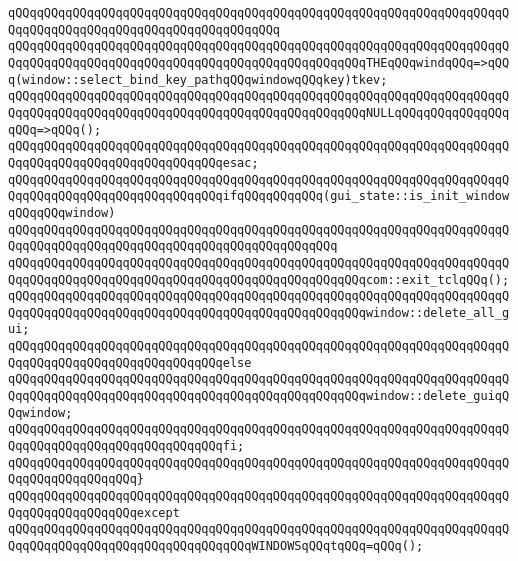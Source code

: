 \verb|qQQqqQQqqQQqqQQqqQQqqQQqqQQqqQQqqQQqqQQqqQQqqQQqqQQqqQQqqQQqqQQqqQQqqQQqqQQqqQQqqQQqqQQqqQQqqQQqqQQqqQQqqQQq|\newline
\verb|qQQqqQQqqQQqqQQqqQQqqQQqqQQqqQQqqQQqqQQqqQQqqQQqqQQqqQQqqQQqqQQqqQQqqQQqqQQqqQQqqQQqqQQqqQQqqQQqqQQqqQQqqQQqqQQqqQQqqQQqTHEqQQqwindqQQq=>qQQq(window::select_bind_key_pathqQQqwindowqQQqkey)tkev;|\newline
\verb|qQQqqQQqqQQqqQQqqQQqqQQqqQQqqQQqqQQqqQQqqQQqqQQqqQQqqQQqqQQqqQQqqQQqqQQqqQQqqQQqqQQqqQQqqQQqqQQqqQQqqQQqqQQqqQQqqQQqqQQqNULLqQQqqQQqqQQqqQQqqQQq=>qQQq();|\newline
\verb|qQQqqQQqqQQqqQQqqQQqqQQqqQQqqQQqqQQqqQQqqQQqqQQqqQQqqQQqqQQqqQQqqQQqqQQqqQQqqQQqqQQqqQQqqQQqqQQqqQQqesac;|\newline
\newline
\verb|qQQqqQQqqQQqqQQqqQQqqQQqqQQqqQQqqQQqqQQqqQQqqQQqqQQqqQQqqQQqqQQqqQQqqQQqqQQqqQQqqQQqqQQqqQQqqQQqqQQqifqQQqqQQqqQQq(gui_state::is_init_windowqQQqqQQqwindow)|\newline
\verb|qQQqqQQqqQQqqQQqqQQqqQQqqQQqqQQqqQQqqQQqqQQqqQQqqQQqqQQqqQQqqQQqqQQqqQQqqQQqqQQqqQQqqQQqqQQqqQQqqQQqqQQqqQQqqQQqqQQq|\newline
\verb|qQQqqQQqqQQqqQQqqQQqqQQqqQQqqQQqqQQqqQQqqQQqqQQqqQQqqQQqqQQqqQQqqQQqqQQqqQQqqQQqqQQqqQQqqQQqqQQqqQQqqQQqqQQqqQQqqQQqqQQqcom::exit_tclqQQq();|\newline
\verb|qQQqqQQqqQQqqQQqqQQqqQQqqQQqqQQqqQQqqQQqqQQqqQQqqQQqqQQqqQQqqQQqqQQqqQQqqQQqqQQqqQQqqQQqqQQqqQQqqQQqqQQqqQQqqQQqqQQqqQQqwindow::delete_all_gui;|\newline
\verb|qQQqqQQqqQQqqQQqqQQqqQQqqQQqqQQqqQQqqQQqqQQqqQQqqQQqqQQqqQQqqQQqqQQqqQQqqQQqqQQqqQQqqQQqqQQqqQQqqQQqelse|\newline
\verb|qQQqqQQqqQQqqQQqqQQqqQQqqQQqqQQqqQQqqQQqqQQqqQQqqQQqqQQqqQQqqQQqqQQqqQQqqQQqqQQqqQQqqQQqqQQqqQQqqQQqqQQqqQQqqQQqqQQqqQQqwindow::delete_guiqQQqwindow;|\newline
\verb|qQQqqQQqqQQqqQQqqQQqqQQqqQQqqQQqqQQqqQQqqQQqqQQqqQQqqQQqqQQqqQQqqQQqqQQqqQQqqQQqqQQqqQQqqQQqqQQqqQQqfi;|\newline
\verb|qQQqqQQqqQQqqQQqqQQqqQQqqQQqqQQqqQQqqQQqqQQqqQQqqQQqqQQqqQQqqQQqqQQqqQQqqQQqqQQqqQQqqQQq}|\newline
\verb|qQQqqQQqqQQqqQQqqQQqqQQqqQQqqQQqqQQqqQQqqQQqqQQqqQQqqQQqqQQqqQQqqQQqqQQqqQQqqQQqqQQqqQQqexcept|\newline
\verb|qQQqqQQqqQQqqQQqqQQqqQQqqQQqqQQqqQQqqQQqqQQqqQQqqQQqqQQqqQQqqQQqqQQqqQQqqQQqqQQqqQQqqQQqqQQqqQQqqQQqqQQqWINDOWSqQQqtqQQq=qQQq();|\newline
